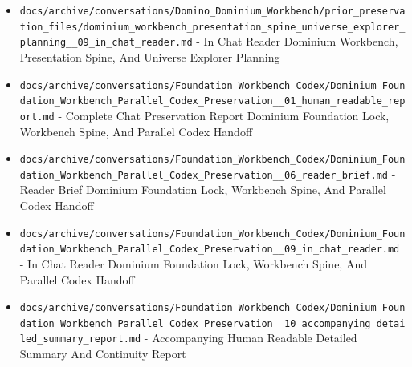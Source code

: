 \documentclass[10.5pt,a4paper,openany]{book}
\begin{document}
\begin{itemize}
\item \texttt{docs/\allowbreak{}archive/\allowbreak{}conversations/\allowbreak{}Domino\_\allowbreak{}Dominium\_\allowbreak{}Workbench/\allowbreak{}prior\_\allowbreak{}preservation\_\allowbreak{}files/\allowbreak{}dominium\_\allowbreak{}workbench\_\allowbreak{}presentation\_\allowbreak{}spine\_\allowbreak{}universe\_\allowbreak{}explorer\_\allowbreak{}planning\_\allowbreak{}\_\allowbreak{}09\_\allowbreak{}in\_\allowbreak{}chat\_\allowbreak{}reader.\allowbreak{}md} -\allowbreak{} In Chat Reader Dominium Workbench, Presentation Spine, And Universe Explorer Planning
\item \texttt{docs/\allowbreak{}archive/\allowbreak{}conversations/\allowbreak{}Foundation\_\allowbreak{}Workbench\_\allowbreak{}Codex/\allowbreak{}Dominium\_\allowbreak{}Foundation\_\allowbreak{}Workbench\_\allowbreak{}Parallel\_\allowbreak{}Codex\_\allowbreak{}Preservation\_\allowbreak{}\_\allowbreak{}01\_\allowbreak{}human\_\allowbreak{}readable\_\allowbreak{}report.\allowbreak{}md} -\allowbreak{} Complete Chat Preservation Report Dominium Foundation Lock, Workbench Spine, And Parallel Codex Handoff
\item \texttt{docs/\allowbreak{}archive/\allowbreak{}conversations/\allowbreak{}Foundation\_\allowbreak{}Workbench\_\allowbreak{}Codex/\allowbreak{}Dominium\_\allowbreak{}Foundation\_\allowbreak{}Workbench\_\allowbreak{}Parallel\_\allowbreak{}Codex\_\allowbreak{}Preservation\_\allowbreak{}\_\allowbreak{}06\_\allowbreak{}reader\_\allowbreak{}brief.\allowbreak{}md} -\allowbreak{} Reader Brief Dominium Foundation Lock, Workbench Spine, And Parallel Codex Handoff
\item \texttt{docs/\allowbreak{}archive/\allowbreak{}conversations/\allowbreak{}Foundation\_\allowbreak{}Workbench\_\allowbreak{}Codex/\allowbreak{}Dominium\_\allowbreak{}Foundation\_\allowbreak{}Workbench\_\allowbreak{}Parallel\_\allowbreak{}Codex\_\allowbreak{}Preservation\_\allowbreak{}\_\allowbreak{}09\_\allowbreak{}in\_\allowbreak{}chat\_\allowbreak{}reader.\allowbreak{}md} -\allowbreak{} In Chat Reader Dominium Foundation Lock, Workbench Spine, And Parallel Codex Handoff
\item \texttt{docs/\allowbreak{}archive/\allowbreak{}conversations/\allowbreak{}Foundation\_\allowbreak{}Workbench\_\allowbreak{}Codex/\allowbreak{}Dominium\_\allowbreak{}Foundation\_\allowbreak{}Workbench\_\allowbreak{}Parallel\_\allowbreak{}Codex\_\allowbreak{}Preservation\_\allowbreak{}\_\allowbreak{}10\_\allowbreak{}accompanying\_\allowbreak{}detailed\_\allowbreak{}summary\_\allowbreak{}report.\allowbreak{}md} -\allowbreak{} Accompanying Human Readable Detailed Summary And Continuity Report

\end{itemize}
\end{document}

